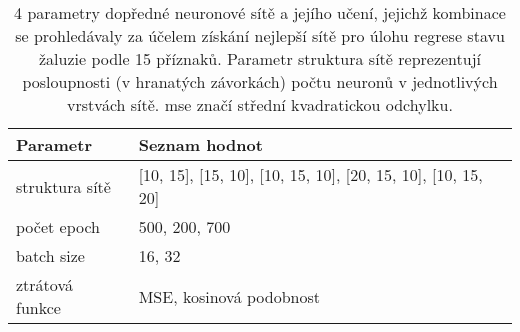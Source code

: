 \begin{table}[htbp]
  \centering
    \begin{tabular}{l|l}
    \toprule
    Parametr & Seznam hodnot \\
    \midrule
    \midrule
    struktura sítě & [10, 15], [15, 10], [10, 15, 10], [20, 15, 10], [10, 15, 20] \\
    \midrule
    počet epoch & 500, 200, 700 \\
    \midrule
    batch size & 16, 32 \\
    \midrule
    ztrátová funkce & MSE, kosinová podobnost \\
    \bottomrule
    \bottomrule
    \end{tabular}%
    \caption[Prohledáváné parametry dopředné neuronové sítě]{4 parametry dopředné neuronové sítě a jejího učení, jejichž kombinace se prohledávaly za účelem získání nejlepší sítě pro úlohu regrese stavu žaluzie podle 15 příznaků. Parametr struktura sítě reprezentují posloupnosti (v hranatých závorkách) počtu neuronů v jednotlivých vrstvách sítě. \acrshort{mse} značí střední kvadratickou odchylku.}
  \label{tab:ffnnhyper}%
\end{table}%
